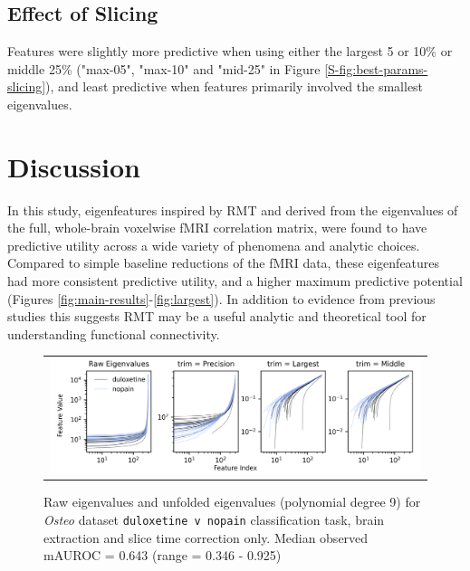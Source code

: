\documentclass[12pt]{spieman}  %
\begin{document}
\begin{spacing}{2}
\subsection{Effect of Slicing}
Features were slightly more predictive when using either the largest 5 or 10\% or middle
25\% ("max-05", "max-10" and "mid-25" in Figure
\ref{S-fig:best-params-slicing}), and least predictive when features primarily
involved the smallest eigenvalues.


\section{Discussion}

In this study, eigenfeatures inspired by RMT and derived from the eigenvalues
of the full, whole-brain voxelwise fMRI correlation matrix, were found to have
predictive utility across a wide variety of phenomena and analytic choices.
Compared to simple baseline reductions of the fMRI data, these eigenfeatures
had more consistent predictive utility, and a higher maximum predictive
potential (Figures \ref{fig:main-results}-\ref{fig:largest}). In addition to
evidence from previous studies
\cite{sebaRandomMatrixAnalysis2003,wangRandomMatrixTheory2016,matharooSpontaneousBackpainAlters2020}
this suggests RMT may be a useful analytic and theoretical tool for
understanding functional connectivity.

\begin{figure}
\begin{center}
\begin{tabular}{c}
\includegraphics[width=6.5in]{unfolded_osteo_duloxetine_v_nopain.png}
\end{tabular}
\end{center}
\caption
{ \label{fig:unfolded} Raw eigenvalues and unfolded eigenvalues (polynomial
degree 9) for \textit{Osteo} dataset \footnotesize\texttt{duloxetine v nopain}
classification task, brain extraction and slice time correction only. Median
observed mAUROC = 0.643 (range = 0.346 - 0.925)}
\end{figure}




\end{spacing}
\end{document}
